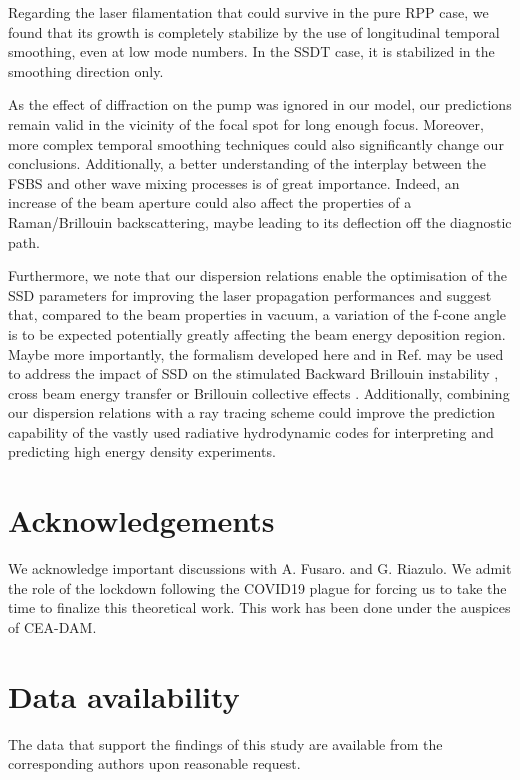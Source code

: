 \documentclass[
 reprint,
 amsmath,amssymb,
 aps,
]{revtex4-1}
\begin{document}
Regarding the laser filamentation that could survive in the pure RPP case, we found that its growth is completely stabilize by  the use of longitudinal  temporal smoothing, even at low mode numbers. In the SSDT case, it is stabilized in the smoothing direction only.

As the effect of diffraction on the pump was ignored in our model, our predictions remain valid in the vicinity of the focal spot  for long enough focus. Moreover, more complex temporal smoothing techniques could also significantly change our conclusions.
Additionally, a  better understanding of the interplay between the FSBS and other wave mixing processes is of great importance. Indeed,  an increase of the beam aperture could also affect the properties of a Raman/Brillouin backscattering, maybe leading  to its  deflection  off the diagnostic path. 

Furthermore, we note that our dispersion relations enable the optimisation of the SSD parameters for improving the laser propagation performances and suggest that, compared to the beam properties in vacuum,  a variation of the f-cone angle is to be expected  potentially greatly  affecting the beam energy deposition region. 
Maybe more importantly, the formalism  developed here and in Ref. \cite[]{Ruyer_FSBS}  may be used to address the impact of SSD on the stimulated   Backward Brillouin instability  \cite[]{POP_Duluc_2019}, cross beam energy transfer \cite[]{PRL_Neuville_2016cbet} or Brillouin collective effects \cite[]{PRL_Neuville_2016}. 
Additionally, combining our dispersion relations with   a ray tracing scheme \cite[]{Strozzi_2017,POP_Debayle_2019} could improve the prediction capability of the vastly used radiative hydrodynamic codes for interpreting and predicting   high energy density experiments.

\section*{Acknowledgements}
We acknowledge important discussions with A. Fusaro. and G. Riazulo. 
We  admit the role of the lockdown following the COVID19 plague for forcing us to take the time to finalize this theoretical work. This work has been done under the auspices of CEA-DAM. 

\section*{Data availability}
The data that support the findings of this study are available from the corresponding authors upon reasonable request.


\end{document}
